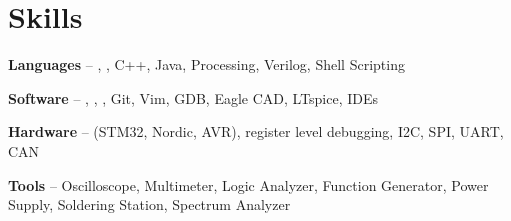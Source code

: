 \section{Skills}
\begin{small}
	
	\parbox[t][][t]{\linewidth}{
		\textbf{Languages} -- , ,
		C++, Java, Processing, Verilog, Shell Scripting
		\bigbreak
	}

	\parbox[t][][t]{\linewidth}{
		\textbf{Software} -- , , , 
		Git, Vim, GDB,  Eagle CAD, LTspice, IDEs
		\bigbreak
	}

	\parbox[t][][t]{\linewidth}{
		\textbf{Hardware} --  (STM32, Nordic, AVR), register level debugging, I2C, SPI, UART, CAN
		\bigbreak
	}
	
	\parbox[t][][t]{\linewidth}{
		\textbf{Tools} -- Oscilloscope, Multimeter, Logic Analyzer, Function Generator, Power Supply, Soldering Station, Spectrum Analyzer
	}
	\smallskip
	
\end{small}